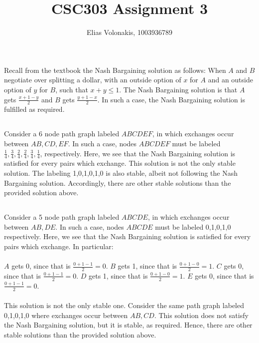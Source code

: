 \documentclass[12pt]{article}
\title{CSC303 Assignment 3}
\author{Elias Volonakis, 1003936789}
\begin{document}
\maketitle

\section{}
Recall from the textbook the Nash Bargaining solution as follows: When $A$ and $B$ negotiate over splitting a dollar, with an outside option of $x$ for $A$ and an outside option of $y$ for $B$, such that $x + y \leq 1$. The Nash Bargaining solution is that $A$ gets $\frac{x+1-y}{2}$ and $B$ gets $\frac{y+1-x}{2}$. In such a case, the Nash Bargaining solution is fulfilled as required. 
\subsection{}
Consider a 6 node path graph labeled $ABCDEF$, in which exchanges occur between $AB, CD, EF$. In such a case, nodes $ABCDEF$ must be labeled $\frac{1}{4}, \frac{3}{4}, \frac{2}{4}, \frac{2}{4}, \frac{3}{4}, \frac{1}{4}$, respectively. Here, we see that the Nash Bargaining solution is satisfied for every pairs which exchange. This solution is not the only stable solution. The labeling 1,0,1,0,1,0 is also stable, albeit not following the Nash Bargaining solution. Accordingly, there are other stable solutions than the provided solution above. 
\subsection{}
Consider a 5 node path graph labeled $ABCDE$, in which exchanges occur between $AB, DE$. In such a case, nodes $ABCDE$ must be labeled 0,1,0,1,0 respectively. Here, we see that the Nash Bargaining solution is satisfied for every pairs which exchange. In particular:
\\
\\
$A$ gets 0, since that is $\frac{0+1-1}{2} = 0$. $B$ gets 1, since that is $\frac{0+1-0}{2} = 1$. $C$ gets 0, since that is $\frac{0+1-1}{2} = 0$. $D$ gets 1, since that is $\frac{0+1-0}{2} = 1$. $E$ gets 0, since that is  $\frac{0+1-1}{2} = 0$. 
\\
\\
This solution is not the only stable one. Consider the same path graph labeled 0,1,0,1,0 where exchanges occur between $AB, CD$. This solution does not satisfy the Nash Bargaining solution, but it is stable, as required. Hence, there are other stable solutions than the provided solution above. 
\end{document}
